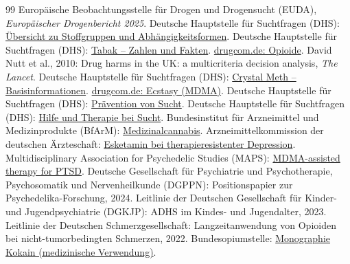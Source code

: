 \documentclass[11pt,a4paper]{article}
\begin{document}
\begin{thebibliography}{99}
		 Europäische Beobachtungsstelle für Drogen und Drogensucht (EUDA), \textit{Europäischer Drogenbericht 2025}.
		 Deutsche Hauptstelle für Suchtfragen (DHS): \href{https://www.dhs.de/suechte}{Übersicht zu Stoffgruppen und Abhängigkeitsformen}.
		 Deutsche Hauptstelle für Suchtfragen (DHS): \href{https://www.dhs.de/suechte/tabak}{Tabak – Zahlen und Fakten}.
		 \href{https://www.drugcom.de/drogen/opioide/}{drugcom.de: Opioide}.
		 David Nutt et al., 2010: Drug harms in the UK: a multicriteria decision analysis, \textit{The Lancet}.
		 Deutsche Hauptstelle für Suchtfragen (DHS): \href{https://www.dhs.de/suechte/crystal-meth}{Crystal Meth – Basisinformationen}.
		 \href{https://www.drugcom.de/drogen/ecstasy/}{drugcom.de: Ecstasy (MDMA)}.
		 Deutsche Hauptstelle für Suchtfragen (DHS): \href{https://www.dhs.de/praevention}{Prävention von Sucht}.
		 Deutsche Hauptstelle für Suchtfragen (DHS): \href{https://www.dhs.de/hilfe-und-therapie}{Hilfe und Therapie bei Sucht}.
		 Bundesinstitut für Arzneimittel und Medizinprodukte (BfArM): \href{https://www.bfarm.de/DE/Bundesopiumstelle/Cannabis/Medizinalcannabis/_node.html}{Medizinalcannabis}.
		 Arzneimittelkommission der deutschen Ärzteschaft: \href{https://www.akdae.de/Arzneimitteltherapie/NA/A-2021-12/}{Esketamin bei therapieresistenter Depression}.
		 Multidisciplinary Association for Psychedelic Studies (MAPS): \href{https://maps.org/mdma/}{MDMA-assisted therapy for PTSD}.
		 Deutsche Gesellschaft für Psychiatrie und Psychotherapie, Psychosomatik und Nervenheilkunde (DGPPN): Positionspapier zur Psychedelika-Forschung, 2024.
		 Leitlinie der Deutschen Gesellschaft für Kinder- und Jugendpsychiatrie (DGKJP): ADHS im Kindes- und Jugendalter, 2023.
		 Leitlinie der Deutschen Schmerzgesellschaft: Langzeitanwendung von Opioiden bei nicht-tumorbedingten Schmerzen, 2022.
		 Bundesopiumstelle: \href{https://www.bfarm.de/DE/Bundesopiumstelle/Betaeubungsmittel/BtM-Monographie/_node.html}{Monographie Kokain (medizinische Verwendung)}.
	\end{thebibliography}
\end{document}
